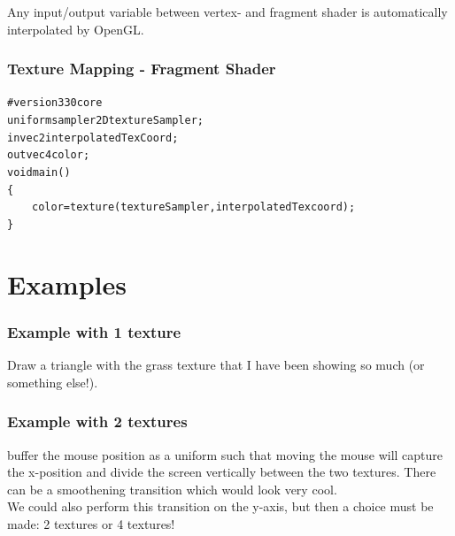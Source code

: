 \documentclass{beamer}
\begin{document}
%
%
%
\begin{frame}
Any input/output variable between vertex- and fragment shader is
automatically interpolated by OpenGL.
\frametitle{Texture Mapping - Fragment Shader}
\begin{alltt}\footnotesize
\#version 330 core\\

uniform sampler2D textureSampler;\\
in vec2 interpolatedTexCoord;\\
out vec4 color;\\

void main()\\
\{\\
\ensuremath{\qquad}color = texture(textureSampler, interpolatedTexcoord);\\
\}
\end{alltt}
\end{frame}


\section{Examples}
%
%
%
\begin{frame}
\frametitle{Example with 1 texture}
Draw a triangle with the grass texture that I have been showing so much
(or something else!).
\end{frame}


%
%
%
\begin{frame}
\frametitle{Example with 2 textures}
buffer the mouse position as a uniform such that moving the mouse
will capture the x-position and divide the screen vertically
between the two textures. There can be a smoothening transition
which would look very cool.\\

We could also perform this transition on the y-axis, but then a
choice must be made: 2 textures or 4 textures!
\end{frame}
\end{document}
